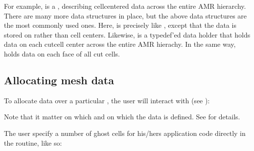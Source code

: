 \documentclass[letterpaper,10pt,english]{sphinxmanual}
\begin{document}
For example,  is a , describing cell\sphinxhyphen{}centered data across the entire AMR hierarchy.
There are many more data structures in place, but the above data structures are the most commonly used ones.
Here,  is precisely like , except that the data is stored on  rather than cell centers.
Likewise,  is a typedef’ed data holder that holds data on each cut\sphinxhyphen{}cell center across the entire AMR hierachy.
In the same way,  holds data on each face of all cut cells.


\subsection{Allocating mesh data}
\label{\detokenize{Source/MeshData:allocating-mesh-data}}
To allocate data over a particular , the user will interact with  (see {\hyperref[\detokenize{Source/AmrMesh:chap-amrmesh}]{}}):

\begin{sphinxVerbatim}[commandchars=\\\{\},formatcom=\scriptsize]
   
 
   
\end{sphinxVerbatim}

Note that it  matter on which  and on which  the data is defined.
See {\hyperref[\detokenize{Source/Realm:chap-realm}]{}} for details.

The user  specify a number of ghost cells for his/hers application code directly in the  routine, like so:
\end{document}
